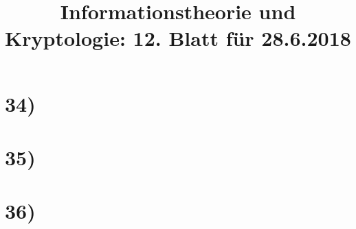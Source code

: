 %



  \title{Informationstheorie und Kryptologie: 12. Blatt für 28.6.2018}
  \maketitle

  \section*{34)}

  \section*{35)}

  \section*{36)}


